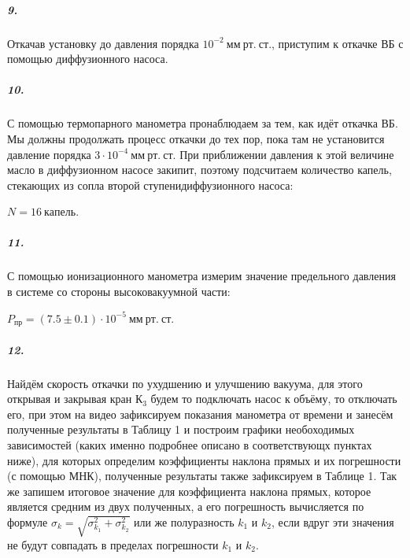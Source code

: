 \documentclass[a4paper,12pt]{article}
\begin{document}
\subparagraph*{9.} Откачав установку до давления порядка $ 10^{-2}~мм~рт.~ ст.$, приступим к откачке ВБ с помощью диффузионного насоса. 


\subparagraph*{10.} С помощью термопарного манометра пронаблюдаем за тем, как идёт откачка ВБ. Мы должны продолжать процесс откачки до тех пор, пока там не установится давление порядка $3 \cdot 10^{-4}~мм~рт.~ ст.$ При приближении давления к этой величине масло в диффузионном насосе закипит, поэтому подсчитаем количество капель, стекающих из сопла второй ступенидиффузионного насоса: 

$
N = 16 ~ капель. 
$


\subparagraph*{11.} С помощью ионизационного манометра измерим значение предельного давления в системе со стороны высоковакуумной части: 

$
P_{пр} = (7.5 \pm 0.1)  \cdot 10^{-5} ~мм ~рт. ~ст.
$


\subparagraph*{12.} Найдём скорость откачки по ухудшению и улучшению вакуума, для этого открывая и закрывая кран $К_3$ будем то подключать насос к объёму, то отключать его, при этом на видео зафиксируем показания манометра от времени и занесём полученные результаты в Таблицу 1 и построим графики необоходимых  зависимостей (каких именно подробнее описано в соответствующх пунктах ниже), для которых определим коэффициенты наклона прямых и их погрешности (с помощью МНК), полученные результаты также зафиксируем в Таблице 1. Так же запишем итоговое значение для коэффициента наклона прямых, которое является средним из двух полученных, а его погрешность вычисляется по формуле $\sigma_k = \sqrt{\sigma_{k_1}^2 + \sigma_{k_2}^2}$ или же полуразность $k_1$ и  $k_2$, если вдруг эти значения не будут совпадать в пределах погрешности $k_1$ и $k_2$.
\end{document}

